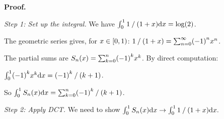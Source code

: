 \documentclass[
]{article}
\begin{document}
\textbf{Proof.}

\emph{Step 1: Set up the integral.} We have
\(\int_{{\mNumber{0}}}^{{\mNumber{1}}} {\mNumber{1}}\mathbin{\mBridgeOperator{/}}\mathopen{\mDelimiter{(}}{\mNumber{1}}+x\mathclose{\mDelimiter{)}} \mathrm{d}x = \log\mathopen{\mDelimiter{(}}{\mNumber{2}}\mathclose{\mDelimiter{)}}\).

The geometric series gives, for
\(x \in \mathopen{\mDelimiter{[}}{\mNumber{0}},{\mNumber{1}}\mathclose{\mDelimiter{)}}\):
\({\mNumber{1}}\mathbin{\mBridgeOperator{/}}\mathopen{\mDelimiter{(}}{\mNumber{1}}+x\mathclose{\mDelimiter{)}} = \sum_{n={\mNumber{0}}}^{\infty} \mathopen{\mDelimiter{(}}-{\mNumber{1}}\mathclose{\mDelimiter{)}}^{n}x^{n}\).

The partial sums are
\(S_{n}\mathopen{\mDelimiter{(}}x\mathclose{\mDelimiter{)}} = \sum_{k={\mNumber{0}}}^{n} \mathopen{\mDelimiter{(}}-{\mNumber{1}}\mathclose{\mDelimiter{)}}^{k}x^{k}\).
By direct computation:

\(\int_{{\mNumber{0}}}^{{\mNumber{1}}} \mathopen{\mDelimiter{(}}-{\mNumber{1}}\mathclose{\mDelimiter{)}}^{k}x^{k} \mathrm{d}x = \mathopen{\mDelimiter{(}}-{\mNumber{1}}\mathclose{\mDelimiter{)}}^{k}\mathbin{\mBridgeOperator{/}}\mathopen{\mDelimiter{(}}k+{\mNumber{1}}\mathclose{\mDelimiter{)}}\).

So
\(\int_{{\mNumber{0}}}^{{\mNumber{1}}} S_{n}\mathopen{\mDelimiter{(}}x\mathclose{\mDelimiter{)}} \mathrm{d}x = \sum_{k={\mNumber{0}}}^{n} \mathopen{\mDelimiter{(}}-{\mNumber{1}}\mathclose{\mDelimiter{)}}^{k}\mathbin{\mBridgeOperator{/}}\mathopen{\mDelimiter{(}}k+{\mNumber{1}}\mathclose{\mDelimiter{)}}\).

\emph{Step 2: Apply DCT.} We need to show
\(\int_{{\mNumber{0}}}^{{\mNumber{1}}} S_{n}\mathopen{\mDelimiter{(}}x\mathclose{\mDelimiter{)}} \mathrm{d}x \to \int_{{\mNumber{0}}}^{{\mNumber{1}}} {\mNumber{1}}\mathbin{\mBridgeOperator{/}}\mathopen{\mDelimiter{(}}{\mNumber{1}}+x\mathclose{\mDelimiter{)}} \mathrm{d}x.\)
\end{document}
